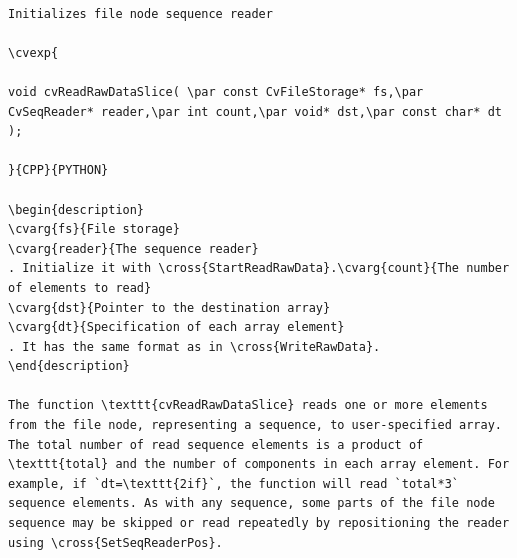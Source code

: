 \begin{verbatim}

Initializes file node sequence reader

\cvexp{

void cvReadRawDataSlice( \par const CvFileStorage* fs,\par CvSeqReader* reader,\par int count,\par void* dst,\par const char* dt );

}{CPP}{PYTHON}

\begin{description}
\cvarg{fs}{File storage}
\cvarg{reader}{The sequence reader}
. Initialize it with \cross{StartReadRawData}.\cvarg{count}{The number of elements to read}
\cvarg{dst}{Pointer to the destination array}
\cvarg{dt}{Specification of each array element}
. It has the same format as in \cross{WriteRawData}.
\end{description}

The function \texttt{cvReadRawDataSlice} reads one or more elements from the file node, representing a sequence, to user-specified array. The total number of read sequence elements is a product of \texttt{total} and the number of components in each array element. For example, if `dt=\texttt{2if}`, the function will read `total*3` sequence elements. As with any sequence, some parts of the file node sequence may be skipped or read repeatedly by repositioning the reader using \cross{SetSeqReaderPos}.


\end{verbatim}
